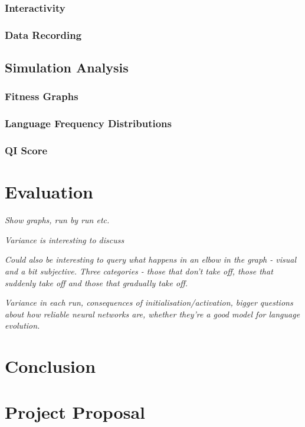 \documentclass[12pt,a4paper,twoside,openright]{report}
\begin{document}
\subsection{Interactivity}

\subsection{Data Recording}

\section{Simulation Analysis}

\subsection{Fitness Graphs}

\subsection{Language Frequency Distributions}

\subsection{QI Score}


\chapter{Evaluation}

\emph{Show graphs, run by run etc.}

\emph{Variance is interesting to discuss}

\emph{Could also be interesting to query what happens in an elbow in the graph - visual and a bit subjective. Three categories - those that don't take off, those that suddenly take off and those that gradually take off.}

\emph{Variance in each run, consequences of initialisation/activation, bigger questions about how reliable neural networks are, whether they're a good model for language evolution. }


\chapter{Conclusion}




\appendix

\chapter{Project Proposal}


\end{document}
